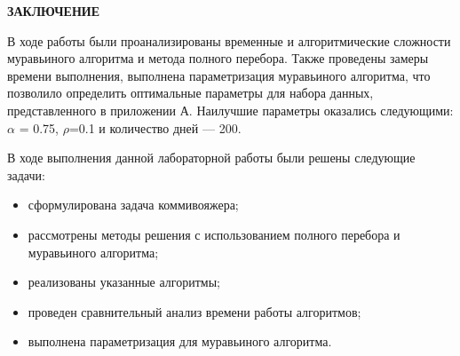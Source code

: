 \begin{center}
    \textbf{ЗАКЛЮЧЕНИЕ}
\end{center}

В ходе работы были проанализированы временные и алгоритмические сложности муравьиного алгоритма и метода полного перебора. Также проведены замеры времени выполнения, выполнена параметризация муравьиного алгоритма, что позволило определить оптимальные параметры для набора данных, представленного в приложении А. Наилучшие параметры оказались следующими: $\alpha$ = 0.75, $\rho$=0.1 и количество дней — 200.
\vspace{5mm}

В ходе выполнения данной лабораторной работы были решены следующие задачи:

\begin{itemize}
	\item сформулирована задача коммивояжера;
    \item рассмотрены методы решения с использованием полного перебора и муравьиного алгоритма;
    \item реализованы указанные алгоритмы;
    \item проведен сравнительный анализ времени работы алгоритмов;
    \item выполнена параметризация для муравьиного алгоритма.
\end{itemize}